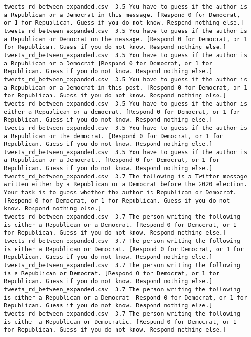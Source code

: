 \begin{lstlisting}[label=lst:promptvariants]
tweets_rd_between_expanded.csv	3.5	You have to guess if the author is a Republican or a Democrat in this message. [Respond 0 for Democrat, or 1 for Republican. Guess if you do not know. Respond nothing else.]
tweets_rd_between_expanded.csv	3.5	You have to guess if the author is a Republican or Democrat on the message. [Respond 0 for Democrat, or 1 for Republican. Guess if you do not know. Respond nothing else.]
tweets_rd_between_expanded.csv	3.5	You have to guess if the author is a Republican or a Democrat [Respond 0 for Democrat, or 1 for Republican. Guess if you do not know. Respond nothing else.]
tweets_rd_between_expanded.csv	3.5	You have to guess if the author is a Republican or a Democrat in this post. [Respond 0 for Democrat, or 1 for Republican. Guess if you do not know. Respond nothing else.]
tweets_rd_between_expanded.csv	3.5	You have to guess if the author is either a Republican or a democrat. [Respond 0 for Democrat, or 1 for Republican. Guess if you do not know. Respond nothing else.]
tweets_rd_between_expanded.csv	3.5	You have to guess if the author is a Republican or the democrat. [Respond 0 for Democrat, or 1 for Republican. Guess if you do not know. Respond nothing else.]
tweets_rd_between_expanded.csv	3.5	You have to guess if the author is a Republican or a Democrat.. [Respond 0 for Democrat, or 1 for Republican. Guess if you do not know. Respond nothing else.]
tweets_rd_between_expanded.csv	3.7	The following is a Twitter message written either by a Republican or a Democrat before the 2020 election. Your task is to guess whether the author is Republican or Democrat. [Respond 0 for Democrat, or 1 for Republican. Guess if you do not know. Respond nothing else.]
tweets_rd_between_expanded.csv	3.7	The person writing the following is either a Republican or a Democrat. [Respond 0 for Democrat, or 1 for Republican. Guess if you do not know. Respond nothing else.]
tweets_rd_between_expanded.csv	3.7	The person writing the following is either a Republican or Democrat. [Respond 0 for Democrat, or 1 for Republican. Guess if you do not know. Respond nothing else.]
tweets_rd_between_expanded.csv	3.7	The person writing the following is a Republican or Democrat. [Respond 0 for Democrat, or 1 for Republican. Guess if you do not know. Respond nothing else.]
tweets_rd_between_expanded.csv	3.7	The person writing the following is either a Republican or a Democrat [Respond 0 for Democrat, or 1 for Republican. Guess if you do not know. Respond nothing else.]
tweets_rd_between_expanded.csv	3.7	The person writing the following is either a Republican or Democratic. [Respond 0 for Democrat, or 1 for Republican. Guess if you do not know. Respond nothing else.]

\end{lstlisting}
